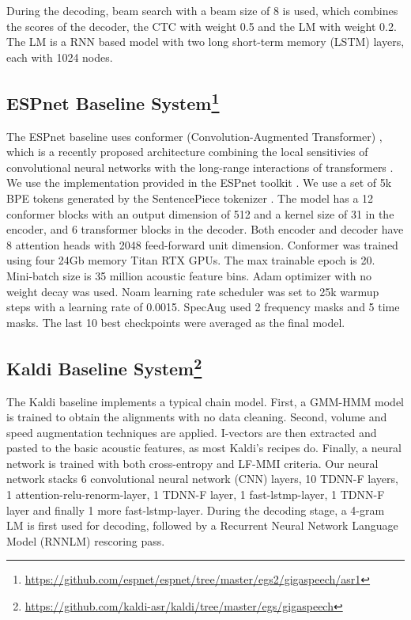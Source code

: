 \documentclass[a4paper]{article}
\begin{document}
During the decoding, beam search with a beam size of 8 is used, which combines
the scores of the decoder, the CTC with weight 0.5 and the LM with weight 0.2.
The LM is a RNN based model with two long short-term memory (LSTM) layers, each
with 1024 nodes.

\subsection[ESPnet Baseline System]{ESPnet Baseline System\footnote{\url{https://github.com/espnet/espnet/tree/master/egs2/gigaspeech/asr1}}\label{foot:espnet}}
The ESPnet baseline uses conformer (Convolution-Augmented Transformer) \cite{gulati2020conformer}, which is a recently proposed architecture combining the local sensitivies of convolutional neural networks with the long-range interactions of transformers \cite{vaswani2017attention}.
We use the implementation provided in the ESPnet toolkit \cite{guo2020recent}.
We use a set of 5k BPE tokens generated by the SentencePiece tokenizer \cite{kudo2018sentencepiece}.
The model has a 12 conformer blocks with an output dimension of 512 and a kernel size of 31 in the encoder, and 6 transformer blocks in the decoder.
Both encoder and decoder have 8 attention heads with 2048 feed-forward unit dimension.
Conformer was trained using four 24Gb memory Titan RTX GPUs. The max trainable epoch is 20. Mini-batch size is 35 million acoustic feature bins. Adam optimizer with no weight decay was used. Noam learning rate scheduler was set to 25k warmup steps with a learning rate of 0.0015. SpecAug used 2 frequency masks and 5 time masks. The last 10 best checkpoints were averaged as the final model.


\subsection[Kaldi Baseline System]{Kaldi Baseline System\footnote{\url{https://github.com/kaldi-asr/kaldi/tree/master/egs/gigaspeech}}\label{foot:kaldi}} \label{sec:kaldi_baseline}
The Kaldi baseline implements a typical chain model. First, a GMM-HMM model is trained to obtain the alignments with no data cleaning. Second, volume and speed augmentation techniques are applied. I-vectors are then extracted and pasted to the basic acoustic features, as most Kaldi's recipes do. Finally, a neural network is trained with both cross-entropy and LF-MMI criteria. Our neural network stacks 6 convolutional neural network (CNN) layers, 10 TDNN-F layers, 1 attention-relu-renorm-layer, 1 TDNN-F layer, 1 fast-lstmp-layer, 1 TDNN-F layer and finally 1 more fast-lstmp-layer. During the decoding stage, a 4-gram LM is first used for decoding, followed by a Recurrent Neural Network Language Model (RNNLM) rescoring pass.
\end{document}

